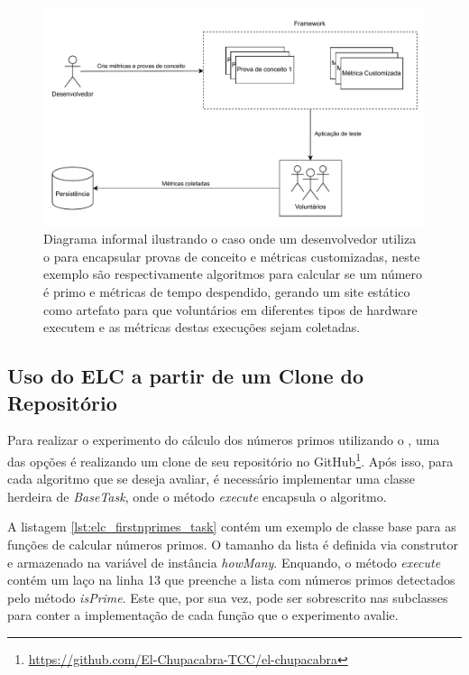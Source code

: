 \documentclass[12pt]{tcc}
\begin{document}
	\begin{figure}[!ht]
		\centering
		\includegraphics[width=\textwidth]{figures/diagrama-informal.pdf}
		\caption{Diagrama informal ilustrando o caso onde um desenvolvedor utiliza o  para encapsular provas de conceito e métricas customizadas, neste exemplo são respectivamente algoritmos para calcular se um número é primo e métricas de tempo despendido, gerando um site estático como artefato para que voluntários em diferentes tipos de hardware executem e as métricas destas execuções sejam coletadas.}
		\label{fig:diagrama-informal}
	\end{figure}

	\subsection{Uso do ELC a partir de um Clone do Repositório}
	\label{subsection:study-case-cloning-elc}

	Para realizar o experimento do cálculo dos números primos utilizando o , uma das opções é realizando um clone de seu repositório no GitHub\footnote{\url{https://github.com/El-Chupacabra-TCC/el-chupacabra}}.
	Após isso, para cada algoritmo que se deseja avaliar, é necessário implementar uma classe herdeira de \emph{BaseTask}, onde o método \emph{execute} encapsula o algoritmo.

	A listagem \ref{lst:elc_firstnprimes_task} contém um exemplo de classe base para as funções de calcular números primos.
	O tamanho da lista é definida via construtor e armazenado na variável de instância \emph{howMany}.
	Enquando, o método \emph{execute} contém um laço na linha 13 que preenche a lista com números primos detectados pelo método \emph{isPrime}.
	Este que, por sua vez, pode ser sobrescrito nas subclasses para conter a implementação de cada função que o experimento avalie.
\end{document}
